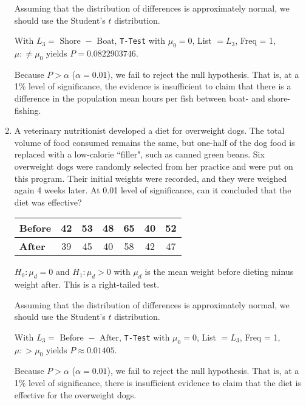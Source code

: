 \begin{enumerate}
{Assuming that the distribution of differences is approximately normal, we should use the Student's $t$ distribution.  

With $L_3 = \mbox{ Shore } - \mbox{ Boat}$, 
\texttt{T-Test} with $\mu_0 = 0$, List $=L_3$, Freq = 1, $\mu: \neq \mu_0$ yields $P = 0.0822903746$.  
	
Because $P > \alpha$ ($\alpha= 0.01$), we fail to reject the null hypothesis.  That is, at a 1\% level of significance, the evidence is insufficient to claim that there is a difference in the population mean hours per fish between boat- and shore-fishing.  
} 

\vfill 

\item A veterinary nutritionist developed a diet for overweight dogs. The total volume of food consumed remains the same, but one-half of the dog food is replaced with a low-calorie ``filler", such as canned green beans. Six overweight dogs were randomly selected from her practice and were put on this program. Their initial weights were recorded, and they were weighed again 4 weeks later. At 0.01 level of significance, can it concluded that the diet was effective?

\begin{center}
\begin{tabular}{l|cccccc}
    \textbf{Before} & 42 & 53 & 48 & 65 & 40 & 52 \\
    \hline
    \textbf{After}  & 39 & 45 & 40 & 58 & 42 & 47 \\
\end{tabular}
\end{center}

{\answer $H_0: \mu_d = 0$ and $H_1: \mu_d > 0$ with $\mu_d$ is the mean weight before dieting minus weight after.
This is a right-tailed test.  

Assuming that the distribution of differences is approximately normal, we should use the Student's $t$ distribution.  

With $L_3 = \mbox{ Before } - \mbox{ After}$, 
\texttt{T-Test} with $\mu_0 = 0$, List $=L_3$, Freq = 1, $\mu: > \mu_0$ yields $P \approx 0.01405$.  
	
Because $P > \alpha$ ($\alpha= 0.01$), we fail to reject the null hypothesis.  That is, at a 1\% level of significance, there is insufficient evidence to claim that the diet is effective for the overweight dogs.} 

\vfill

\end{enumerate}
